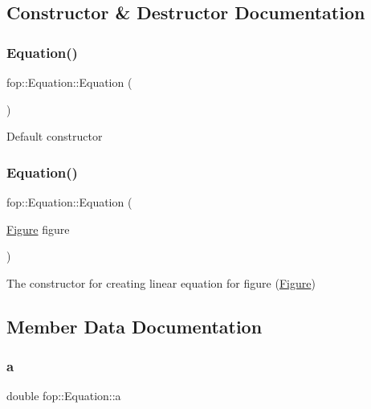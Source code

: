 \subsection{Constructor \& Destructor Documentation}
\mbox{\label{structfop_1_1_equation_a6cd4c227e9b83e949c4c2568854512a3}} 
\subsubsection{\texorpdfstring{Equation()}{Equation()}\hspace{0.1cm}{\footnotesize\ttfamily [1/2]}}
{\footnotesize\ttfamily fop\+::\+Equation\+::\+Equation (\begin{DoxyParamCaption}{ }\end{DoxyParamCaption})}

Default constructor \mbox{\label{structfop_1_1_equation_a93886a166390114aa62609af6ddd1d72}} 
\subsubsection{\texorpdfstring{Equation()}{Equation()}\hspace{0.1cm}{\footnotesize\ttfamily [2/2]}}
{\footnotesize\ttfamily fop\+::\+Equation\+::\+Equation (\begin{DoxyParamCaption}\item[{\mbox{\hyperlink{classfop_1_1_figure}{Figure}}}]{figure }\end{DoxyParamCaption})}

The constructor for creating linear equation for \textquotesingle{}figure\textquotesingle{} (\mbox{\hyperlink{classfop_1_1_figure}{Figure}}) 

\subsection{Member Data Documentation}
\mbox{\label{structfop_1_1_equation_a9cc4610dcc3a68de1def70a8573cf75f}} 
\subsubsection{\texorpdfstring{a}{a}}
{\footnotesize\ttfamily double fop\+::\+Equation\+::a}


